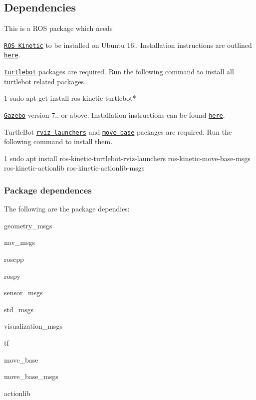 \subsection*{Dependencies}

This is a R\+OS package which needs
\begin{DoxyItemize}
\item \href{http://wiki.ros.org/kinetic}{\tt R\+OS Kinetic} to be installed on Ubuntu 16.. Installation instructions are outlined \href{http://wiki.ros.org/kinetic/Installation/Ubuntu}{\tt here}.
\item \href{https://www.turtlebot.com/}{\tt Turtlebot} packages are required. Run the following command to install all turtlebot related packages. 
\begin{DoxyCode}
1 sudo apt-get install ros-kinetic-turtlebot*
\end{DoxyCode}

\item \href{http://gazebosim.org/}{\tt Gazebo} version 7.. or above. Installation instructions can be found \href{http://gazebosim.org/tutorials?cat=guided_b&tut=guided_b1}{\tt here}.
\item Turtle\+Bot \href{http://wiki.ros.org/turtlebot_rviz_launchers}{\tt rviz\+\_\+launchers} and \href{http://wiki.ros.org/move_base}{\tt move\+\_\+base} packages are required. Run the following command to install them. 
\begin{DoxyCode}
1 sudo apt install ros-kinetic-turtlebot-rviz-launchers ros-kinetic-move-base-msgs ros-kinetic-actionlib
       ros-kinetic-actionlib-msgs
\end{DoxyCode}

\end{DoxyItemize}

\subsubsection*{Package dependences}

The following are the package dependies\+:
\begin{DoxyItemize}
\item geometry\+\_\+msgs
\item nav\+\_\+msgs
\item roscpp
\item rospy
\item sensor\+\_\+msgs
\item std\+\_\+msgs
\item visualization\+\_\+msgs
\item tf
\item move\+\_\+base
\item move\+\_\+base\+\_\+msgs
\item actionlib
\end{DoxyItemize}


